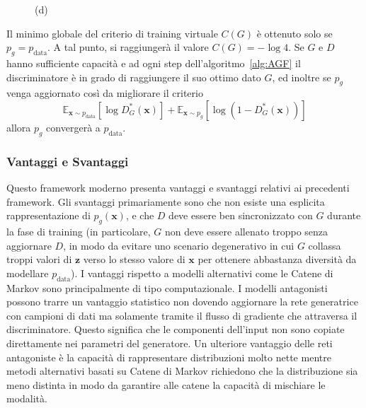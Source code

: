 \begin{figure}[p]
\begin{minipage}[b]{0.5\linewidth}
   (d) 
    \vspace{4ex}
  \end{minipage}
   \caption{\label{fig:intuition} }
 
\end{figure}

Il minimo globale del criterio di training virtuale $C(G)$ è ottenuto solo se $p_g=p_\text{data}$. 
A tal punto, si raggiungerà il valore $C(G) = -\log 4$. 
Se $G$ e $D$ hanno sufficiente capacità e ad ogni step dell'algoritmo~\ref{alg:AGF} il discriminatore è in grado di raggiungere il suo ottimo dato $G$, ed inoltre se $p_g$ venga aggiornato così da migliorare il criterio 
\[\mathbb{E}_{\bm{x} \sim p_\text{data}}[\log D^*_G(\bm{x})] + \mathbb{E}_{\bm{x} \sim p_g}[\log (1 - D^*_G(\bm{x}))]\] 
allora $p_g$ convergerà a $p_\text{data}$.

\subsubsection{Vantaggi e Svantaggi}
Questo framework moderno presenta vantaggi  e svantaggi relativi ai precedenti framework. Gli svantaggi primariamente sono che non esiste una esplicita rappresentazione di $p_g(\bm{x})$, e che $D$ deve essere ben sincronizzato con $G$ durante la fase di training (in particolare, $G$ non deve essere allenato troppo senza aggiornare $D$, in modo da evitare uno scenario degenerativo in cui $G$ collassa troppi valori di $\mathbf{z}$ verso lo stesso valore di $\mathbf{x}$ per ottenere abbastanza diversità da modellare $p_\text{data}$). 
I vantaggi rispetto a modelli alternativi come le Catene di Markov sono principalmente di tipo computazionale. I modelli antagonisti possono trarre un vantaggio statistico non dovendo aggiornare la rete generatrice con campioni di dati ma solamente tramite il flusso di gradiente che attraversa il discriminatore. Questo significa che le componenti dell'input non sono copiate direttamente nei parametri del generatore. Un ulteriore vantaggio delle reti antagoniste è la capacità di rappresentare distribuzioni molto nette mentre metodi alternativi basati su Catene di Markov richiedono che la distribuzione sia meno distinta in modo da garantire alle catene la capacità di mischiare le modalità.

